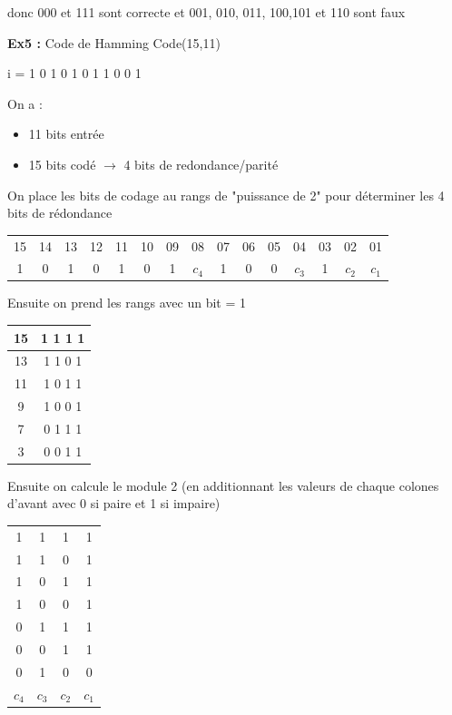 \documentclass[12pt]{article}
\begin{document}
				donc 000 et 111 sont correcte et 001, 010, 011, 100,101 et 110 sont faux
				
			\textbf{Ex5 :} Code de Hamming
				Code(15,11)
				
				i = 1 0 1 0 1 0 1 1 0 0 1
				
				On a :
				\begin{itemize}
					\item 11 bits entrée
					\item 15 bits codé $\rightarrow$ 4 bits de redondance/parité
				\end{itemize}
				
				On place les bits de codage au rangs de "puissance de 2" pour déterminer les 4 bits de rédondance
				
				\begin{tabular}{ccccccccccccccc}
					15 & 14 & 13 & 12 & 11 & 10 & 09 & 08 & 07 & 06 & 05 & 04 & 03 & 02 & 01\\
					1 & 0 & 1 & 0 & 1 & 0 & 1 & $c_4$ & 1 & 0 & 0 & $c_3$ & 1 & $c_2$ & $c_1$ 
				\end{tabular}
				
				Ensuite on prend les rangs avec un bit = 1
				
				\begin{tabular}{c|c}
				15 & 1 1 1 1\\\hline
				13 & 1 1 0 1\\\hline
				11 & 1 0 1 1\\\hline
				9  & 1 0 0 1\\\hline
				7  & 0 1 1 1\\\hline
				3  & 0 0 1 1
				
				\end{tabular}
				
				Ensuite on calcule le module 2 (en additionnant les valeurs de chaque colones d'avant avec 0 si paire et 1 si impaire)
				
				\begin{tabular}{cccc}
				1 & 1 & 1 & 1\\
				1 & 1 & 0 & 1\\
				1 & 0 & 1 & 1\\
				1 & 0 & 0 & 1\\
				0 & 1 & 1 & 1\\
				0 & 0 & 1 & 1\\ \hline
				0 & 1 & 0 & 0\\
				$c_4$ & $c_3$ & $c_2$ & $c_1$
				
				\end{tabular}
				
\end{document}
